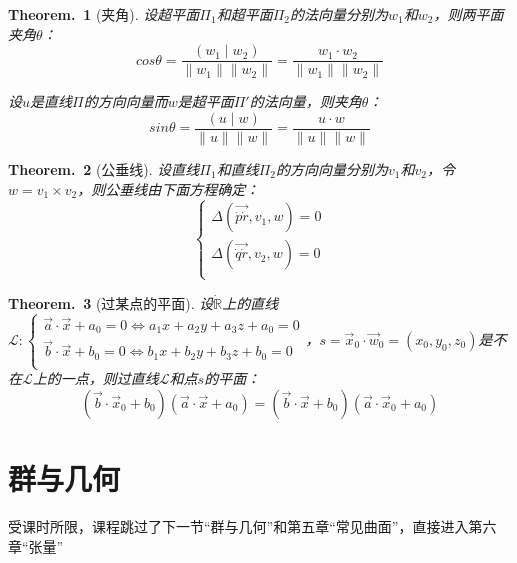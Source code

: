 \documentclass[zihao=-4,UTF8]{report}
\def\R{\mathbb{R}}
\theoremstyle{mystyle} %
\newtheorem{theorem}{Theorem.\,}
\begin{document}
\begin{theorem}[夹角]\label{夹角}
设超平面$\Pi_1$和超平面$\Pi_2$的法向量分别为$w_1$和$w_2$，则两平面夹角$\theta$：
\begin{equation*}
    cos \theta = \frac{(w_1\mid w_2)}{\|w_1\|\|w_2\|} = \frac{w_1\cdot w_2}{\|w_1\|\|w_2\|}
\end{equation*}

设$u$是直线$\Pi$的方向向量而$w$是超平面$\Pi'$的法向量，则夹角$\theta$：
\begin{equation*}
    sin \theta = \frac{(u\mid w)}{\|u\|\|w\|} = \frac{u\cdot w}{\|u\|\|w\|}
\end{equation*}

\end{theorem}

\begin{theorem}[公垂线]\label{公垂线}
设直线$\Pi_1$和直线$\Pi_2$的方向向量分别为$v_1$和$v_2$，令$w=v_1\times v_2$，则公垂线由下面方程确定：
\begin{equation*}
    \begin{cases}
        \Delta (\overrightarrow{\dot{p}\dot{r}},v_1,w)=0 \\
        \Delta (\overrightarrow{\dot{q}\dot{r}},v_2,w)=0 \\
    \end{cases}
\end{equation*}
\end{theorem}

\begin{theorem}[过某点的平面]\label{过某点的平面}
设$\dot{\R}$上的直线$\mathscr{L}:\begin{cases}
    \vec{a}\cdot\vec{x}+a_0=0\Longleftrightarrow a_1x+a_2y+a_3z+a_0=0 \\
    \vec{b}\cdot\vec{x}+b_0=0\Longleftrightarrow b_1x+b_2y+b_3z+b_0=0 \\
\end{cases} $，$s=\vec{x}_0\cdot\vec{w}_0 = (x_0,y_0,z_0)$是不在$\mathscr{L}$上的一点，则过直线$\mathscr{L}$和点$s$的平面：
\begin{equation*}
    (\vec{b}\cdot\vec{x}_0+b_0)(\vec{a}\cdot\vec{x}+a_0)=(\vec{b}\cdot\vec{x}+b_0)(\vec{a}\cdot\vec{x}_0+a_0)
\end{equation*}

\end{theorem}


\section{群与几何}
{\par\color{gray}
受课时所限，课程跳过了下一节“群与几何”和第五章“常见曲面”，直接进入第六章“张量”
\par}
\end{document}
